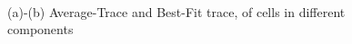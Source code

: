 \documentclass[10pt]{article}
\begin{document}
\begin{figure}[h!]
\centering
{}\\
\caption{(a)-(b) Average-Trace and Best-Fit trace, of cells in different components}
\label{fig:avgTraces_components}
\end{figure}
\end{document}
